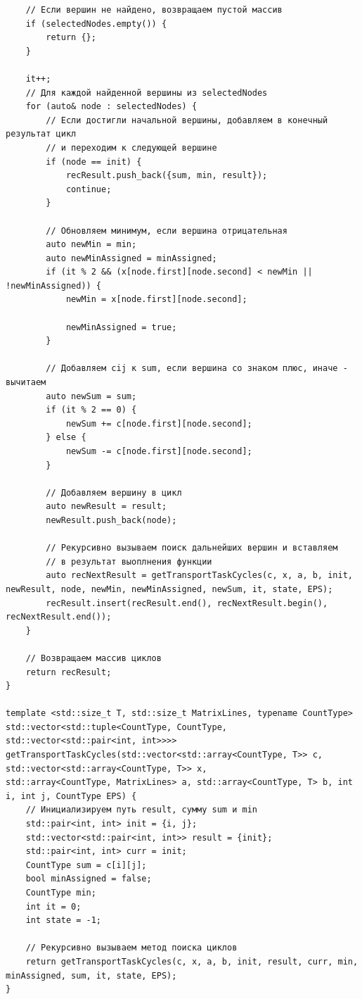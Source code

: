 \documentclass[a4paper,14pt]{extarticle}
\begin{document}
\begin{verbatim}
    // Если вершин не найдено, возвращаем пустой массив
    if (selectedNodes.empty()) {
        return {};
    }

    it++;
    // Для каждой найденной вершины из selectedNodes
    for (auto& node : selectedNodes) {
        // Если достигли начальной вершины, добавляем в конечный результат цикл
        // и переходим к следующей вершине
        if (node == init) {
            recResult.push_back({sum, min, result});
            continue;
        }

        // Обновляем минимум, если вершина отрицательная
        auto newMin = min;
        auto newMinAssigned = minAssigned;
        if (it % 2 && (x[node.first][node.second] < newMin || !newMinAssigned)) {
            newMin = x[node.first][node.second];

            newMinAssigned = true;
        }

        // Добавляем cij к sum, если вершина со знаком плюс, иначе - вычитаем
        auto newSum = sum;
        if (it % 2 == 0) {
            newSum += c[node.first][node.second];
        } else {
            newSum -= c[node.first][node.second];
        }

        // Добавляем вершину в цикл
        auto newResult = result;
        newResult.push_back(node);

        // Рекурсивно вызываем поиск дальнейших вершин и вставляем
        // в результат выоплнения функции
        auto recNextResult = getTransportTaskCycles(c, x, a, b, init, newResult, node, newMin, newMinAssigned, newSum, it, state, EPS);
        recResult.insert(recResult.end(), recNextResult.begin(), recNextResult.end());
    }

    // Возвращаем массив циклов
    return recResult;
}

template <std::size_t T, std::size_t MatrixLines, typename CountType>
std::vector<std::tuple<CountType, CountType, std::vector<std::pair<int, int>>>> getTransportTaskCycles(std::vector<std::array<CountType, T>> c, std::vector<std::array<CountType, T>> x, 
std::array<CountType, MatrixLines> a, std::array<CountType, T> b, int i, int j, CountType EPS) {
    // Инициализируем путь result, сумму sum и min
    std::pair<int, int> init = {i, j};
    std::vector<std::pair<int, int>> result = {init};
    std::pair<int, int> curr = init;
    CountType sum = c[i][j];
    bool minAssigned = false;
    CountType min;
    int it = 0;
    int state = -1;

    // Рекурсивно вызываем метод поиска циклов
    return getTransportTaskCycles(c, x, a, b, init, result, curr, min, minAssigned, sum, it, state, EPS);
}


\end{verbatim}
\end{document}
